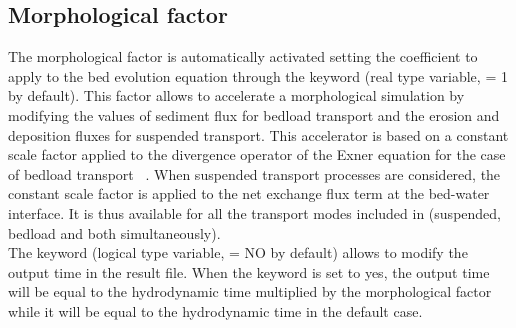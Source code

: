 \subsection{Morphological factor}
The morphological factor is automatically activated setting the coefficient to
apply to the bed evolution equation through the keyword  (real type variable, {\ttfamily = 1}  by default). This factor allows
to accelerate a morphological simulation by modifying the values of sediment
flux for bedload transport and the erosion and deposition fluxes for suspended
transport. This accelerator is based on a constant scale factor applied to the
divergence operator of the Exner equation for the case of bedload transport
~\citep{MORGAN2020107088,ROELVINK2006277}. When suspended transport processes
are considered, the constant scale factor is applied to the net exchange flux
term at the bed-water interface. It is thus available for all the transport
modes included in \gaia (suspended, bedload and both simultaneously). \\
The keyword  (logical type
 variable, {\ttfamily = NO} by default) allows to modify the output time in the
\gaia result file. When the keyword is set to yes, the output time will be equal
 to the hydrodynamic time multiplied by the morphological factor while it will
be equal to the hydrodynamic time in the default case.
